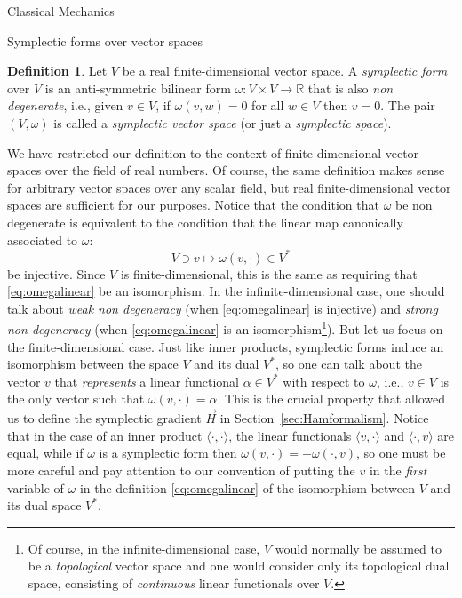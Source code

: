 \documentclass[oneside,a4paper,11pt]{amsbook}
\newcommand{\R}{\mathds R}
\theoremstyle{remark}\newtheorem{exercise}{Exercise}[chapter]
\theoremstyle{plain}\newtheorem{teo}{Theorem}[section]
\theoremstyle{plain}\newtheorem{lem}[teo]{Lemma}
\theoremstyle{plain}\newtheorem{prop}[teo]{Proposition}
\theoremstyle{plain}\newtheorem{cor}[teo]{Corollary}
\theoremstyle{definition}\newtheorem{defin}[teo]{Definition}
\theoremstyle{remark}\newtheorem{rem}[teo]{Remark}
\theoremstyle{definition}\newtheorem{notation}[teo]{Notation}
\theoremstyle{definition}\newtheorem{convention}[teo]{Convention}
\theoremstyle{definition}\newtheorem{example}[teo]{Example}
\numberwithin{section}{chapter}
\numberwithin{equation}{section}
\begin{document}
\begin{chapter}{Classical Mechanics}
\begin{section}{Symplectic forms over vector spaces}
\begin{defin}
Let $V$ be a real finite-dimensional vector space. A {\em symplectic form\/} over $V$ is an anti-symmetric bilinear
form $\omega:V\times V\to\R$ that is also {\em non degenerate}, i.e., given $v\in V$, if $\omega(v,w)=0$ for all
$w\in V$ then $v=0$. The pair $(V,\omega)$ is called a {\em symplectic vector space\/} (or just a {\em symplectic space}).
\end{defin}
We have restricted our definition to the context of finite-dimensional vector spaces over the field of real numbers.
Of course, the same definition makes sense for arbitrary vector spaces over any scalar field, but real finite-dimensional
vector spaces are sufficient for our purposes. Notice that the condition that $\omega$ be non degenerate is equivalent
to the condition that the linear map canonically associated to $\omega$:
\begin{equation}\label{eq:omegalinear}
V\ni v\longmapsto\omega(v,\cdot)\in V^*
\end{equation}
be injective. Since $V$ is finite-dimensional, this is the same as requiring that \eqref{eq:omegalinear} be an isomorphism.
In the infinite-dimensional case, one should talk about {\em weak non degeneracy\/} (when \eqref{eq:omegalinear}
is injective) and {\em strong non degeneracy\/} (when \eqref{eq:omegalinear} is an isomorphism\footnote{%
Of course, in the infinite-dimensional case, $V$ would normally be assumed to be a {\em topological\/} vector space
and one would consider only its topological dual space, consisting of {\em continuous\/} linear functionals over $V$.}).
But let us focus on the finite-dimensional case.
Just like inner products, symplectic forms induce an isomorphism between the space $V$ and its dual $V^*$, so one
can talk about the vector $v$ that {\em represents\/} a linear functional $\alpha\in V^*$ with respect to $\omega$,
i.e., $v\in V$ is the only vector such that $\omega(v,\cdot)=\alpha$. This is the crucial property that allowed
us to define the symplectic gradient $\vec H$ in Section~\ref{sec:Hamformalism}.
Notice that in the case of an inner product $\langle\cdot,\cdot\rangle$, the linear
functionals $\langle v,\cdot\rangle$ and $\langle\cdot,v\rangle$ are equal, while if $\omega$ is a symplectic
form then $\omega(v,\cdot)=-\omega(\cdot,v)$, so one must be more careful and pay attention to our convention of putting
the $v$ in the {\em first\/} variable of $\omega$ in the definition \eqref{eq:omegalinear}
of the isomorphism between $V$ and its dual space $V^*$.


\end{section}
\end{chapter}
\end{document}

